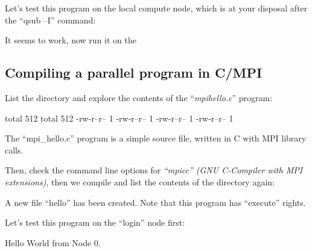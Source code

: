 Let's test this program on the local compute node, which is at your disposal
after the ``qsub --I'' command:



It seems to work, now run it on the \hpc

\begin{prompt}
\end{prompt}

\subsection{Compiling a parallel program in C/MPI}

\begin{prompt}
\end{prompt}

List the directory and explore the contents of the ``\textit{mpihello.c}'' program:

\begin{prompt}
total 512
total 512
-rw-r--r-- 1 %
-rw-r--r-- 1 %
-rw-r--r-- 1 %
-rw-r--r-- 1 %
\end{prompt}


The ``mpi\_hello.c'' program is a simple source file, written in C with MPI library calls.

Then, check the command line options for \emph{``mpicc'' (GNU C-Compiler with
MPI extensions)}, then we compile and list the contents of the directory again:

\begin{prompt}
\end{prompt}

A new file ``hello'' has been created. Note that this program has ``execute''
rights.

Let's test this program on the ``login'' node first:

\begin{prompt}
Hello World from Node 0.
\end{prompt}

